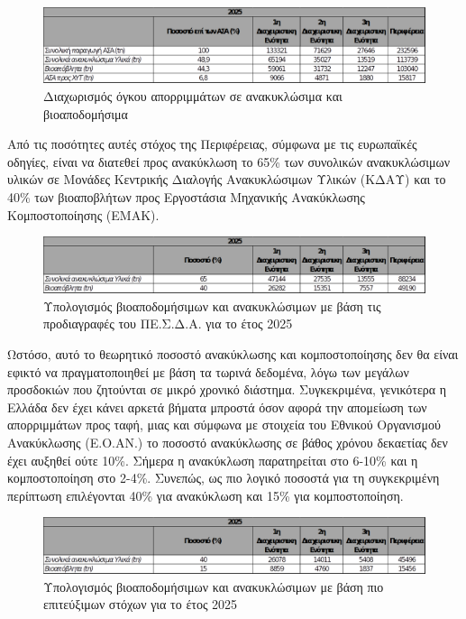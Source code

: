\documentclass[12pt]{article}
\begin{document}
	\begin{figure} [H]
		\begin{center}
			\includegraphics [scale = 0.45] {table16.png}
			\caption{Διαχωρισμός όγκου απορριμμάτων σε ανακυκλώσιμα και βιοαποδομήσιμα}
		\end{center}
	\end{figure}
	
	Από τις ποσότητες αυτές στόχος της Περιφέρειας, σύμφωνα με τις ευρωπαϊκές οδηγίες, είναι να διατεθεί προς ανακύκλωση το 65\% των συνολικών ανακυκλώσιμων υλικών σε Μονάδες Κεντρικής Διαλογής Ανακυκλώσιμων Υλικών (ΚΔΑΥ) και το 40\% των βιοαποβλήτων προς Εργοστάσια Μηχανικής Ανακύκλωσης Κομποστοποίησης (ΕΜΑΚ).
	
	\begin{figure} [H]
		\begin{center}
			\includegraphics [scale = 0.45] {table17.png}
			\caption{Υπολογισμός βιοαποδομήσιμων και ανακυκλώσιμων με βάση τις προδιαγραφές του ΠΕ.Σ.Δ.Α. για το έτος 2025}
		\end{center}
	\end{figure}

	Ωστόσο, αυτό το θεωρητικό ποσοστό ανακύκλωσης και κομποστοποίησης δεν θα είναι εφικτό να πραγματοποιηθεί με βάση τα τωρινά δεδομένα, λόγω των μεγάλων προσδοκιών που ζητούνται σε μικρό χρονικό διάστημα. Συγκεκριμένα, γενικότερα η Ελλάδα δεν έχει κάνει αρκετά βήματα μπροστά όσον αφορά την απομείωση των απορριμμάτων προς ταφή, μιας και σύμφωνα με στοιχεία του Εθνικού Οργανισμού Ανακύκλωσης (Ε.Ο.ΑΝ.) το ποσοστό ανακύκλωσης σε βάθος χρόνου δεκαετίας  δεν έχει αυξηθεί ούτε 10\%. Σήμερα η ανακύκλωση παρατηρείται στο 6-10\% και η κομποστοποίηση στο 2-4\%. Συνεπώς, ως πιο λογικό ποσοστά για τη συγκεκριμένη περίπτωση επιλέγονται  40\% για ανακύκλωση και 15\% για κομποστοποίηση.
	
	\begin{figure} [H]
		\begin{center}
			\includegraphics [scale = 0.45] {table18.png}
			\caption{Υπολογισμός βιοαποδομήσιμων και ανακυκλώσιμων με βάση πιο επιτεύξιμων στόχων για το έτος 2025}
		\end{center}
	\end{figure}
\end{document}
